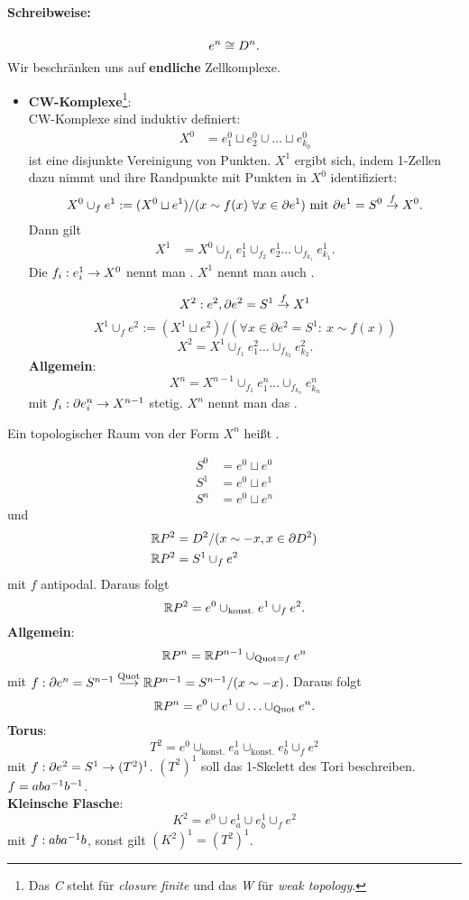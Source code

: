 \paragraph{Schreibweise:}
\[ e^n \overset{}{\cong}D^n. \]
Wir beschränken uns auf \textbf{endliche} Zellkomplexe.
\begin{itemize}
	\item \textbf{CW-Komplexe}\footnote{Das \emph{C} steht für \emph{closure finite} und das \emph{W} für \emph{weak topology}.}:\\
	CW-Komplexe sind induktiv definiert:
	\begin{align*}
	X^0 &= e_1^0 \sqcup e_2^0 \cup \ldots \sqcup e_{k_0}^0 
	\end{align*}
	ist eine disjunkte Vereinigung von Punkten.
	$X^1$ ergibt sich, indem 1-Zellen dazu nimmt und ihre Randpunkte mit Punkten in $X^0$ identifiziert:
	\[ X^0 \cup_f e^1 := (X^0 \sqcup e^1)/( x\sim f(x)~\forall x \in \partial e^1) \text{ mit }\partial e^1 = S^0 \overset{f}{\rightarrow} X^0. \]
	Dann gilt
	\begin{align*}
	X^1 &= X^0 \cup_{f_1} e_1^1
	\cup_{f_2} e_2^1 \ldots
	\cup_{f_{k_1}} e_{k_1}^1.
	\end{align*}
	Die $f_i : e_i^1 \overset{}{\rightarrow} X^0$ nennt man . $X^1$ nennt man auch .
	
	\[ X^2 : e^2, \partial e^2 = S^1 \overset{f}{\rightarrow} X^1 \]
	\[ X^1 \cup_f e^2 := (X^1 \sqcup e^2) / (\forall x \in \partial e^2 = S^1: ~x\sim f(x)) \]
	\[ X^2 = X^1 \cup_{f_1} e^2_1 \ldots \cup_{f_{k_2}}e_{k_2}^2. \]
	 \textbf{Allgemein}:
	\[ X^n = X^{n-1} \cup_{f_1} e^n_1 \ldots \cup_{f_{k_n}} e_{k_n}^n \]
	mit $f_i : \partial e_i^n \overset{}{\rightarrow} X^{n-1}$ stetig. $X^n$ nennt man das .
\end{itemize}

\Def{}
Ein topologischer Raum von der Form $X^n$ heißt .

\Bsp{}
\begin{align*}
S^0 &= e^0 \sqcup e^0\\
S^1 &= e^0\sqcup e^1\\
S^n &= e^0 \sqcup e^n
\end{align*}
und
\begin{align*}
\mathbb{R} P^2 &= D^2 /(x \sim -x, x \in \partial D^2)\\
\mathbb{R} P^2 &= S^1\cup_f e^2
\end{align*}
mit $f$ antipodal. Daraus folgt
\[ \mathbb{R} P^2 = e^0\cup_{\mathrm{konst.}} e^1 \cup_f e^2. \]
\textbf{Allgemein}:
\[ \mathbb{R} P^n = \mathbb{R} P^{n-1} \cup_{\mathrm{Quot} = f}e^n \]
mit $f : \partial e^n = S^{n-1} \overset{\mathrm{Quot}}{\longrightarrow} \mathbb{R} P^{n-1} = S^{n-1}/(x\sim - x)$.
Daraus folgt
\[ \mathbb{R} P^n = e^0 \cup e^1 \cup \ldots \cup_{\mathrm{Quot}} e^n. \]
\textbf{Torus}:
\[ T^2 = e^0 \cup_{\mathrm{konst.}} e^1_a \cup_{\mathrm{konst.}} e^1_b \cup_f e^2 \]
mit $f : \partial e^2 = S^1 \overset{}{\rightarrow} (T^2)^1$. $(T^2)^1$ soll das 1-Skelett des Tori beschreiben. $f = aba^{-1} b^{-1}$.\\
\textbf{Kleinsche Flasche}:
\[ K^2 = e^0 \cup e^1_a \cup e^1_b \cup_f e^2  \]
mit $f : aba^{-1} b$, sonst gilt $(K^2)^1 = (T^2)^1$.


